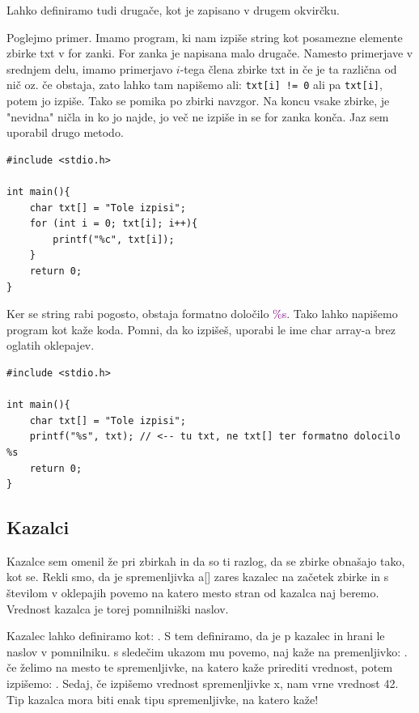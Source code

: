\documentclass[a4paper, 12pt]{article}
\begin{document}
Lahko definiramo tudi drugače, kot je zapisano v drugem okvirčku.

Poglejmo primer. Imamo program, ki nam izpiše string kot posamezne elemente zbirke txt v for zanki. For zanka je napisana malo drugače. Namesto primerjave v srednjem delu, imamo primerjavo $i$-tega člena zbirke txt in če je ta različna od nič oz. če obstaja, zato lahko tam napišemo ali: \texttt{txt[i] != 0} ali pa \texttt{txt[i]}, potem jo izpiše. Tako se pomika po zbirki navzgor. Na koncu vsake zbirke, je "nevidna" ničla in ko jo najde, jo več ne izpiše in se for zanka konča. Jaz sem uporabil drugo metodo.

\begin{lstlisting}
#include <stdio.h>

int main(){
	char txt[] = "Tole izpisi";
	for (int i = 0; txt[i]; i++){
		printf("%c", txt[i]);
	}
	return 0;
}
\end{lstlisting}

Ker se string rabi pogosto, obstaja formatno določilo \textcolor{purple}{\%s}. Tako lahko napišemo program kot kaže koda. Pomni, da ko izpišeš, uporabi le ime char array-a brez oglatih oklepajev.

\begin{lstlisting}
#include <stdio.h>

int main(){
	char txt[] = "Tole izpisi";
	printf("%s", txt); // <-- tu txt, ne txt[] ter formatno dolocilo %s
	return 0;
}
\end{lstlisting}

\subsection{Kazalci}

Kazalce sem omenil že pri zbirkah in da so ti razlog, da se zbirke obnašajo tako, kot se. Rekli smo, da je spremenljivka a[] zares kazalec na začetek zbirke in s številom v oklepajih povemo na katero mesto stran od kazalca naj beremo. Vrednost kazalca je torej pomnilniški naslov.\

Kazalec lahko definiramo kot: . S tem definiramo, da je p kazalec in hrani le naslov v pomnilniku. s sledečim ukazom mu povemo, naj kaže na premenljivko:  . če želimo na mesto te spremenljivke, na katero kaže prirediti vrednost, potem izpišemo: . Sedaj, če izpišemo vrednost spremenljivke x, nam vrne vrednost 42. Tip kazalca mora biti enak tipu spremenljivke, na katero kaže!\
\end{document}
